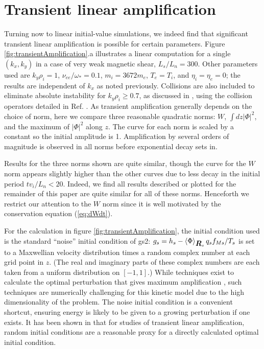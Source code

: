 \documentclass[12pt,superscriptaddress]{revtex4}
\newcommand{\vect}[1]{\mbox{\boldmath $#1$}}
\begin{document}
\section{Transient linear amplification}
\label{sec:transient}

Turning now to linear initial-value simulations,
we indeed find that significant transient linear amplification is possible for certain parameters.
Figure \ref{fig:transientAmplification}.a illustrates
a linear computation for a single $(k_x,k_y)$ in a case of very weak magnetic shear, $L_s / L_n = 300$.
Other parameters used are $k_y \rho_i = 1$, $\nu_{ee} / \omega_* = 0.1$,
$m_i = 3672 m_e$,
$T_e = T_i$, and $\eta_i = \eta_e = 0$;
the results are independent of $k_x$ as noted previously.
Collisions are also included to eliminate absolute instability for $k_y \rho_i \ge 0.7$,
as discussed in \cite{usUniversalInstability},
using the collision operators detailed in Ref. \cite{Abel}.
As transient amplification generally depends on the choice
of norm, here we compare three reasonable quadratic norms: $W$, $\int dz |\Phi|^2$,
and the maximum of $|\Phi|^2$ along $z$.
The curve for each norm is scaled by a constant so the initial amplitude is 1.
Amplification by several orders of magnitude is observed in all norms
before exponential decay sets in.

Results for the three norms shown are quite similar,
though the curve for the $W$ norm appears slightly higher than the other curves
due to less decay in the initial period $t v_i / L_n <20$.
Indeed, we find
all results described or plotted for the remainder of this paper are quite similar
for all of these norms.
Henceforth we restrict our attention to the $W$ norm since it is well motivated
by the conservation equation (\ref{eq:dWdt}).

For the calculation in figure \ref{fig:transientAmplification}, the initial condition used
is the standard ``noise'' initial condition of gs2:
$g_s = h_s - \left< \Phi\right>_{\vect{R}_s} q_s f_{Ms} / T_s$ is set to a Maxwellian velocity distribution
times a random complex number at each grid point in $z$.
(The real and imaginary parts of these complex numbers are each taken from a uniform distribution on $[-1,1]$.)
While techniques exist to calculate the optimal perturbation
that gives maximum amplification \cite{FarrellIoannou, SquirePRL, SquireApJ}, such techniques
are numerically challenging for this kinetic model due to the high dimensionality
of the problem.
The noise initial condition is a convenient shortcut, ensuring energy is likely
to be given to a growing perturbation if one exists.
It has been shown in \cite{Camargo, SquireApJ} that for studies of transient linear
amplification, random initial conditions are a reasonable proxy
for a directly calculated optimal initial condition.
\end{document}
